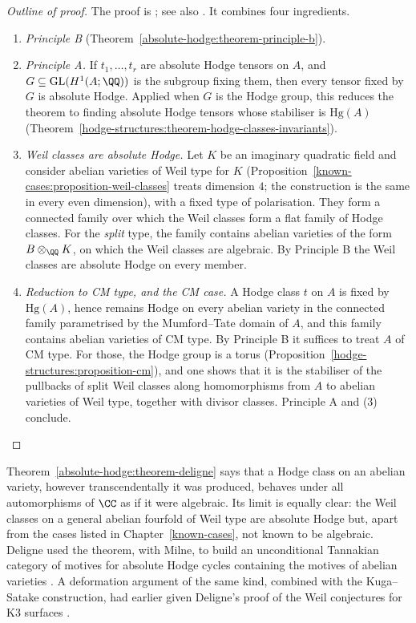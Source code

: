 \begin{proof}[Outline of proof]
The proof is \cite{deligne-abelian}; see also \cite{charles-schnell}. It combines four ingredients.
\begin{enumerate}
\item \emph{Principle B} (Theorem~\ref{absolute-hodge:theorem-principle-b}).
\item \emph{Principle A.} If $t_1, \ldots, t_r$ are absolute Hodge tensors on $A$, and $G \subseteq \mathrm{GL}(H^1(A; \QQ))$ is the subgroup fixing them, then every tensor fixed by $G$ is absolute Hodge. Applied
when $G$ is the Hodge group, this reduces the theorem to finding absolute Hodge tensors whose stabiliser is $\mathrm{Hg}(A)$ (Theorem~\ref{hodge-structures:theorem-hodge-classes-invariants}).
\item \emph{Weil classes are absolute Hodge.} Let $K$ be an imaginary quadratic field and consider abelian varieties of Weil type for $K$ (Proposition~\ref{known-cases:proposition-weil-classes} treats
dimension $4$; the construction is the same in every even dimension), with a fixed type of polarisation. They form a connected family over which the Weil classes form a flat family of Hodge classes. For
the \emph{split} type, the family contains abelian varieties of the form $B \otimes_\QQ K$, on which the Weil classes are algebraic. By Principle B the Weil classes are absolute Hodge on every member.
\item \emph{Reduction to CM type, and the CM case.} A Hodge class $t$ on $A$ is fixed by $\mathrm{Hg}(A)$, hence remains Hodge on every abelian variety in the connected family parametrised by the
Mumford--Tate domain of $A$, and this family contains abelian varieties of CM type. By Principle B it suffices to treat $A$ of CM type. For those, the Hodge group is a torus
(Proposition~\ref{hodge-structures:proposition-cm}), and one shows that it is the stabiliser of the pullbacks of split Weil classes along homomorphisms from $A$ to abelian varieties of Weil type, together with
divisor classes. Principle A and (3) conclude.
\end{enumerate}
\end{proof}

\begin{remark}\label{absolute-hodge:remark-force-and-limits}
Theorem~\ref{absolute-hodge:theorem-deligne} says that a Hodge class on an abelian variety, however transcendentally it was produced, behaves under all automorphisms of $\CC$ as if it were algebraic. Its
limit is equally clear: the Weil classes on a general abelian fourfold of Weil type are absolute Hodge but, apart from the cases listed in Chapter~\ref{known-cases}, not known to be algebraic. Deligne used
the theorem, with Milne, to build an unconditional Tannakian category of motives for absolute Hodge cycles containing the motives of abelian varieties \cite{deligne-milne}. A deformation argument of the
same kind, combined with the Kuga--Satake construction, had earlier given Deligne's proof of the Weil conjectures for K3 surfaces \cite{deligne-k3}.
\end{remark}


